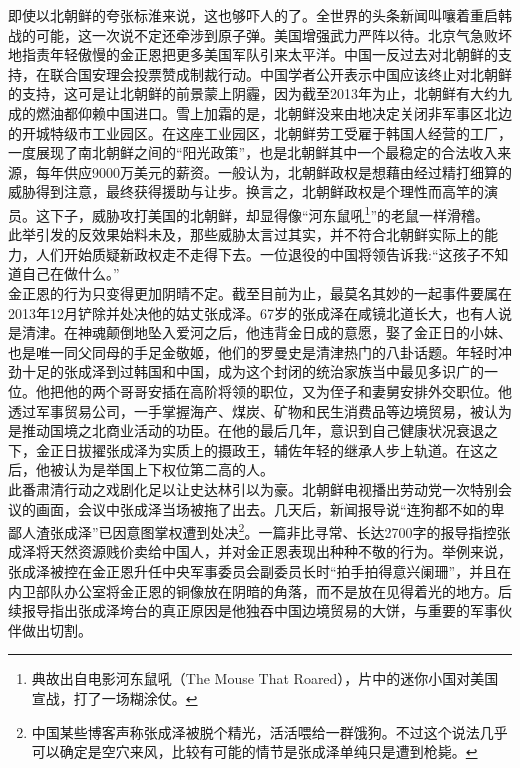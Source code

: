 即使以北朝鲜的夸张标淮来说，这也够吓人的了。全世界的头条新闻叫嚷着重启韩战的可能，这一次说不定还牵涉到原子弹。美国增强武力严阵以待。北京气急败坏地指责年轻傲慢的金正恩把更多美国军队引来太平洋。中国一反过去对北朝鲜的支持，在联合国安理会投票赞成制裁行动。中国学者公开表示中国应该终止对北朝鲜的支持，这可是让北朝鲜的前景蒙上阴霾，因为截至2013年为止，北朝鲜有大约九成的燃油都仰赖中国进口。雪上加霜的是，北朝鲜没来由地决定关闭非军事区北边的开城特级市工业园区。在这座工业园区，北朝鲜劳工受雇于韩国人经营的工厂，一度展现了南北朝鲜之间的“阳光政策”，也是北朝鲜其中一个最稳定的合法收入来源，每年供应9000万美元的薪资。一般认为，北朝鲜政权是想藉由经过精打细算的威胁得到注意，最终获得援助与让步。换言之，北朝鲜政权是个理性而高竿的演员。这下子，威胁攻打美国的北朝鲜，却显得像“河东鼠吼\footnote{典故出自电影河东鼠吼（The Mouse That Roared），片中的迷你小国对美国宣战，打了一场糊涂仗。}”的老鼠一样滑稽。\\

此举引发的反效果始料未及，那些威胁太言过其实，并不符合北朝鲜实际上的能力，人们开始质疑新政权走不走得下去。一位退役的中国将领告诉我:“这孩子不知道自己在做什么。”\\

金正恩的行为只变得更加阴晴不定。截至目前为止，最莫名其妙的一起事件要属在2013年12月铲除并处决他的姑丈张成泽。67岁的张成泽在咸镜北道长大，也有人说是清津。在神魂颠倒地坠入爱河之后，他违背金日成的意愿，娶了金正日的小妹、也是唯一同父同母的手足金敬姬，他们的罗曼史是清津热门的八卦话题。年轻时冲劲十足的张成泽到过韩国和中国，成为这个封闭的统治家族当中最见多识广的一位。他把他的两个哥哥安插在高阶将领的职位，又为侄子和妻舅安排外交职位。他透过军事贸易公司，一手掌握海产、煤炭、矿物和民生消费品等边境贸易，被认为是推动国境之北商业活动的功臣。在他的最后几年，意识到自己健康状况衰退之下，金正日拔擢张成泽为实质上的摄政王，辅佐年轻的继承人步上轨道。在这之后，他被认为是举国上下权位第二高的人。\\

此番肃清行动之戏剧化足以让史达林引以为豪。北朝鲜电视播出劳动党一次特别会议的画面，会议中张成泽当场被拖了出去。几天后，新闻报导说“连狗都不如的卑鄙人渣张成泽”已因意图掌权遭到处决\footnote{中国某些博客声称张成泽被脱个精光，活活喂给一群饿狗。不过这个说法几乎可以确定是空穴来风，比较有可能的情节是张成泽单纯只是遭到枪毙。}。一篇非比寻常、长达2700字的报导指控张成泽将天然资源贱价卖给中国人，并对金正恩表现出种种不敬的行为。举例来说，张成泽被控在金正恩升任中央军事委员会副委员长时“拍手拍得意兴阑珊”，并且在内卫部队办公室将金正恩的铜像放在阴暗的角落，而不是放在见得着光的地方。后续报导指出张成泽垮台的真正原因是他独吞中国边境贸易的大饼，与重要的军事伙伴做出切割。\\

